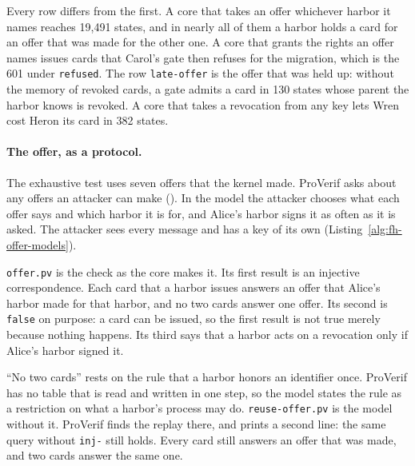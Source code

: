 Every row differs from the first. A core that takes an offer whichever
harbor it names reaches 19,491 states, and in nearly all of them a harbor
holds a card for an offer that was made for the other one. A core that
grants the rights an offer names issues cards that Carol's gate then
refuses for the migration, which is the 601 under \texttt{refused}. The
row \texttt{late-offer} is the offer that was held up: without the memory
of revoked cards, a gate admits a card in 130 states whose parent the
harbor knows is revoked. A core that takes a revocation from any key lets
Wren cost Heron its card in 382 states.

\paragraph{The offer, as a protocol.}
The exhaustive test uses seven offers that the kernel made. ProVerif asks
about any offers an attacker can make
(). In the model the attacker chooses
what each offer says and which harbor it is for, and Alice's harbor signs
it as often as it is asked. The attacker sees every message and has a
key of its own (Listing~\ref{alg:fh-offer-models}).


\texttt{offer.pv} is the check as the core makes it. Its first result is
an injective correspondence. Each card that a harbor issues answers an
offer that Alice's harbor made for that harbor, and no two cards answer
one offer. Its second is \texttt{false} on purpose: a card can be issued,
so the first result is not true merely because nothing happens. Its third
says that a harbor acts on a revocation only if Alice's harbor signed it.

``No two cards'' rests on the rule that a harbor honors an identifier
once. ProVerif has no table that is read and written in one step, so the
model states the rule as a restriction on what a harbor's process may do.
\texttt{reuse-offer.pv} is the model without it. ProVerif finds the
replay there, and prints a second line: the same query without
\texttt{inj-} still holds. Every card still answers an offer that was
made, and two cards answer the same one.



